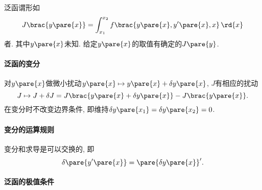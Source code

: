 \documentclass[../LectureNotes.tex]{subfiles}
\begin{document}
泛函谓形如
\[ J\brac{y\pare{x}} = \int_{x_1}^{x_2} f\brac{y\pare{x},y'\pare{x},x}\,\rd{x} \]
者. 其中$y\pare{x}$未知. 给定$y\pare{x}$的取值有确定的$J\pare{y}$.


\paragraph{泛函的变分} %
\label{par:泛函的变分}

对$y\pare{x}$做微小扰动$y\pare{x}\mapsto y\pare{x} + \delta y\pare{x}$, $J$有相应的扰动
\[ J\mapsto J+\delta J = J\brac{y\pare{x} + \delta y\pare{x}} - J\brac{y\pare{x}}. \]
在变分时不改变边界条件, 即维持$\delta y\pare{x_1} = \delta y\pare{x_2} = 0$.


\paragraph{变分的运算规则} %
\label{par:变分的运算规则}

变分和求导是可以交换的, 即
\[ \delta \pare{y'\pare{x}} = \pare{\delta y\pare{x}}'. \]


\paragraph{泛函的极值条件} %
\label{par:泛函的极值条件}
\end{document}
